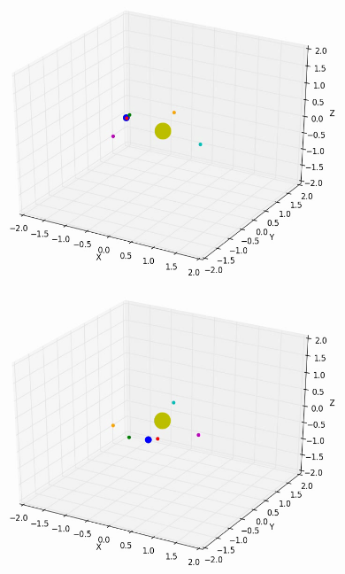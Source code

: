 \documentclass[10pt,letterpaper]{article}
\begin{document}
\begin{figure}[!htb]
  \includegraphics[width=\linewidth]{figures/lagrange_points/lagrange_points_l2_vx_001_1.png}
  \subcaption{}\label{fig:lagrange_points_l2_vx_001_fig1}
\endminipage\hfill
{}
  \includegraphics[width=\linewidth]{figures/lagrange_points/lagrange_points_l2_vx_001_2.png}
  \subcaption{}\label{fig:lagrange_points_l2_vx_001_fig2}
\endminipage\hfill
{}%

\end{figure}
\end{document}
